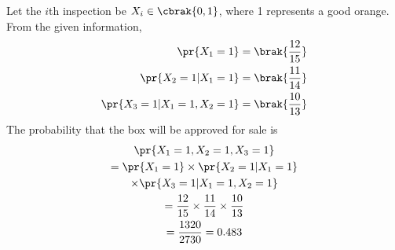 %
Let the $i$th inspection be $X_i \in \cbrak{0,1}$, where  1 represents a good orange.  From the given information,
\begin{align}
\pr{X_1=1}&=\brak{\frac{12}{15}}\\ 
\pr{X_2=1|X_1=1}&=\brak{\frac{11}{14}} \\ 
\pr{X_3=1|X_1=1,X_2=1} &= \brak{\frac{10}{13}}
\end{align}
%
The probability that the box will be approved for sale is
\begin{multline}
\pr{X_1=1,X_2=1,X_3=1} 
\\
= \pr{X_1=1} \times \pr{X_2=1|X_1=1} 
\\
\times \pr{X_3=1|X_1=1,X_2=1} \\ 
=\frac{12}{15}\times \frac{11}{14} \times \frac{10}{13}\\ 
=\frac{1320}{2730} =0.483 
\end{multline}